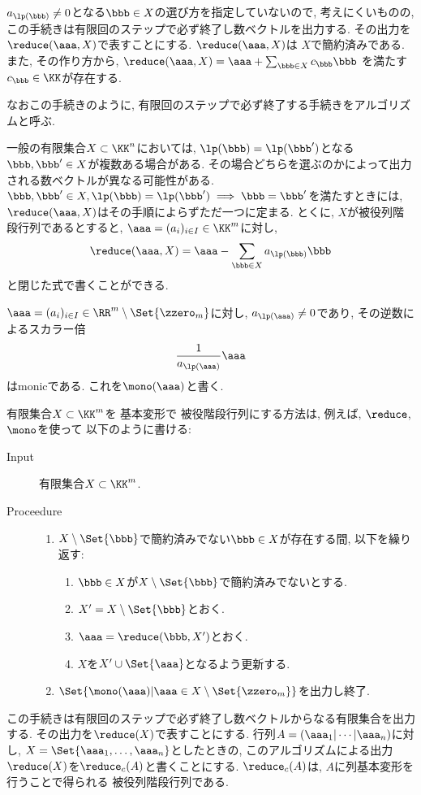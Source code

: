 $a_{\lp(\bbb)}\neq 0$となる$\bbb\in X$の選び方を指定していないので,
考えにくいものの,
この手続きは有限回のステップで必ず終了し数ベクトルを出力する.
その出力を$\reduce(\aaa,X)$で表すことにする.
$\reduce(\aaa,X)$は
$X$で簡約済みである.
また, その作り方から,
$\reduce(\aaa,X)=\aaa+\sum_{\bbb\in X}c_{\bbb} \bbb$
を満たす$c_{\bbb}\in\KK$が存在する.
\begin{remark}
  なおこの手続きのように,
  有限回のステップで必ず終了する手続きをアルゴリズムと呼ぶ.
\end{remark}
\begin{remark}
  \label{rem:reduce:proj}
  一般の有限集合$X\subset \KK^n$においては,
  $\lp(\bbb)=\lp(\bbb')$となる$\bbb,\bbb'\in X$が複数ある場合がある.
  その場合どちらを選ぶのかによって出力される数ベクトルが異なる可能性がある.
  $\bbb,\bbb'\in X,\lp(\bbb)=\lp(\bbb')\implies \bbb=\bbb'$を満たすときには,
  $\reduce(\aaa,X)$はその手順によらずただ一つに定まる.
  とくに,
  $X$が被役列階段行列であるとすると,
  $\aaa=(a_i)_{i\in I}\in \KK^m$に対し,
  \begin{align*}
    \reduce(\aaa,X)=\aaa-\sum_{\bbb\in X}a_{\lp(\bbb)}\bbb
  \end{align*}
  と閉じた式で書くことができる.
\end{remark}
$\aaa=(a_i)_{i\in I}\in \RR^m\setminus\Set{\zzero_{m}}$に対し,
$a_{\lp(\aaa)}\neq 0$であり, その逆数によるスカラー倍
\begin{align*}
  \frac{1}{a_{\lp(\aaa)}}\aaa
\end{align*}
はmonicである.
これを$\mono(\aaa)$と書く.

有限集合$X\subset\KK^m$を
基本変形で
被役階段行列にする方法は,
例えば,
$\reduce$, $\mono$を使って
以下のように書ける:
\begin{algorithm}\makebox{}
\begin{description}
\item[Input]
  有限集合$X\subset\KK^m$.
\item[Proceedure]\makebox{}
  \begin{enumerate}
  \item $X\setminus\Set{\bbb}$で簡約済みでない$\bbb\in X$が存在する間,
    以下を繰り返す:
    \begin{enumerate}
    \item $\bbb\in X$が$X\setminus\Set{\bbb}$で簡約済みでないとする.
    \item $X'=X\setminus\Set{\bbb}$とおく.
    \item $\aaa=\reduce(\bbb,X')$とおく.
    \item $X$を$X'\cup \Set{\aaa}$となるよう更新する.
    \end{enumerate}
  \item $\Set{\mono(\aaa)|\aaa\in X\setminus\Set{\zzero_m}}$を出力し終了.
  \end{enumerate}
\end{description}
\end{algorithm}
この手続きは有限回のステップで必ず終了し数ベクトルからなる有限集合を出力する.
その出力を$\reduce(X)$で表すことにする.
行列$A=(\aaa_1|\cdots|\aaa_n)$に対し,
$X=\Set{\aaa_1,\ldots,\aaa_n}$としたときの,
このアルゴリズムによる出力$\reduce(X)$を$\reduce_c(A)$と書くことにする.
$\reduce_c(A)$は,
$A$に列基本変形を行うことで得られる
被役列階段行列である.

